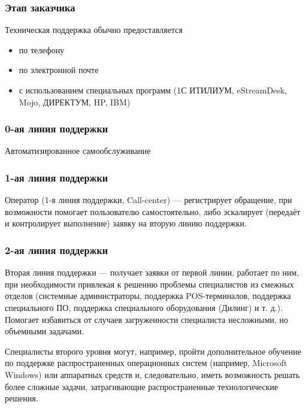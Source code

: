 \documentclass{../industrial-development}
\begin{document}
\lecturenotes

\begin{frame} \frametitle{Этап заказчика}

Техническая поддержка обычно предоставляется 
	\begin{itemize}
        \item по телефону
        \item по электронной почте
        \item с использованием специальных программ (1С ИТИЛИУМ, eStreamDesk, Mojo, ДИРЕКТУМ, HP, IBM)
	\end{itemize}
\end{frame}

\lecturenotes

\begin{frame} \frametitle{0-ая линия поддержки}

    Автоматизированное самообслуживание

\end{frame}
\lecturenotes

\begin{frame} \frametitle{1-ая линия поддержки}

    Оператор (1-я линия поддержки, Call-center) — регистрирует обращение, при возможности помогает пользователю самостоятельно, либо эскалирует (передаёт и контролирует выполнение) заявку на вторую линию поддержки.

\end{frame}
\lecturenotes

\begin{frame} \frametitle{2-ая линия поддержки}

    Вторая линия поддержки — получает заявки от первой линии, работает по ним, при необходимости привлекая к решению проблемы специалистов из смежных отделов (системные администраторы, поддержка POS-терминалов, поддержка специального ПО, поддержка специального оборудования (Дилинг) и т. д.). Помогает избавиться от случаев загруженности специалиста несложными, но объемными задачами. 

\end{frame}
\lecturenotes
Специалисты второго уровня могут, например, пройти дополнительное обучение по поддержке распространенных операционных систем (например, Microsoft Windows) или аппаратных средств и, следовательно, иметь возможность решать более сложные задачи, затрагивающие распространенные технологические решения.
\end{document}
